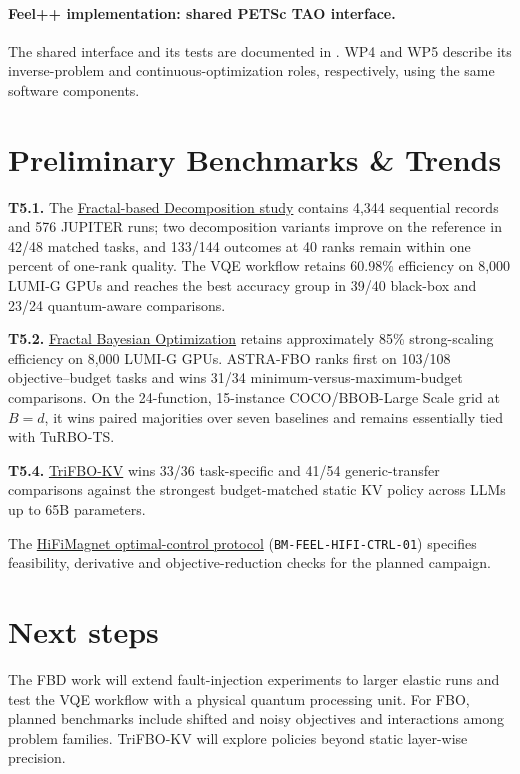 \paragraph{Feel++ implementation: shared PETSc TAO interface.}
The shared interface and its tests are documented in . WP4 and WP5 describe its inverse-problem and continuous-optimization roles, respectively, using the same software components.

\section{Preliminary Benchmarks \& Trends}
\label{sec:wp5:benchmarks}


\textbf{T5.1.} The \hyperref[tab:advance:WP5-A2026-1]{Fractal-based Decomposition study} contains 4,344 sequential records and 576 JUPITER runs; two decomposition variants improve on the reference in 42/48 matched tasks, and 133/144 outcomes at 40 ranks remain within one percent of one-rank quality. The VQE workflow retains 60.98\% efficiency on 8,000 LUMI-G GPUs and reaches the best accuracy group in 39/40 black-box and 23/24 quantum-aware comparisons.

\textbf{T5.2.} \hyperref[tab:advance:WP5-A2026-2]{Fractal Bayesian Optimization} retains approximately 85\% strong-scaling efficiency on 8,000 LUMI-G GPUs. ASTRA-FBO ranks first on 103/108 objective--budget tasks and wins 31/34 minimum-versus-maximum-budget comparisons. On the 24-function, 15-instance COCO/BBOB-Large Scale grid at $B=d$, it wins paired majorities over seven baselines and remains essentially tied with TuRBO-TS.

\textbf{T5.4.} \hyperref[tab:advance:WP5-A2026-3]{TriFBO-KV} wins 33/36 task-specific and 41/54 generic-transfer comparisons against the strongest budget-matched static KV policy across LLMs up to 65B parameters.

The \hyperref[sec:app:specs:app-feelpp-hifimagnet-optcontrol]{HiFiMagnet
optimal-control protocol} (\nolinkurl{BM-FEEL-HIFI-CTRL-01}) specifies
feasibility, derivative and objective-reduction checks for the planned
campaign.

\section{Next steps}

The FBD work will extend fault-injection experiments to larger elastic
runs and test the VQE workflow with a physical quantum processing unit.
For FBO, planned benchmarks include shifted and noisy objectives and
interactions among problem families. TriFBO-KV will explore policies
beyond static layer-wise precision.
